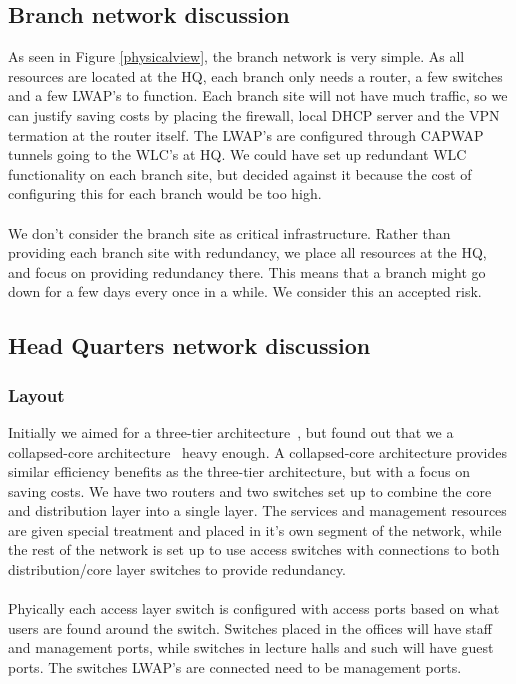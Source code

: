 
\subsection{Branch network discussion}


As seen in Figure \ref{physicalview}, the branch network is very simple. As all resources are located at the HQ, each branch only needs a router, a few switches and a few LWAP's to function. Each branch site will not have much traffic, so we can justify saving costs by placing the firewall, local DHCP server and the VPN termation at the router itself. The LWAP's are configured through CAPWAP tunnels going to the WLC's at HQ. We could have set up redundant WLC functionality on each branch site, but decided against it because the cost of configuring this for each branch would be too high.
\\
\\
We don't consider the branch site as critical infrastructure. Rather than providing each branch site with redundancy, we place all resources at the HQ, and focus on providing redundancy there. This means that a branch might go down for a few days every once in a while. We consider this an accepted risk.

\subsection{Head Quarters network discussion}

\subsubsection{Layout}

Initially we aimed for a three-tier architecture~\cite{todo}, but found out that we a collapsed-core architecture~\cite{todo} heavy enough. A collapsed-core architecture provides similar efficiency benefits as the three-tier architecture, but with a focus on saving costs. We have two routers and two switches set up to combine the core and distribution layer into a single layer. The services and management resources are given special treatment and placed in it's own segment of the network, while the rest of the network is set up to use access switches with connections to both distribution/core layer switches to provide redundancy.
\\
\\
Phyically each access layer switch is configured with access ports based on what users are found around the switch. Switches placed in the offices will have staff and management ports, while switches in lecture halls and such will have guest ports. The switches LWAP's are connected need to be management ports. 

